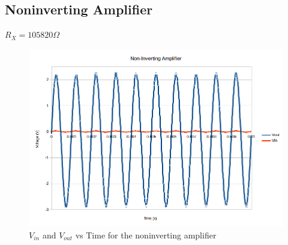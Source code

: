 \documentclass[10pt]{article}
\begin{document}
\subsection*{Noninverting Amplifier}
$R_X = 105820 \Omega$
\begin{figure}[H]
	\centering
	\includegraphics[width=\textwidth]{NonInvertingAmp.png}
	\caption{$V_{in}$ and $V_{out}$ vs Time for the noninverting amplifier}
\end{figure}
\end{document}
